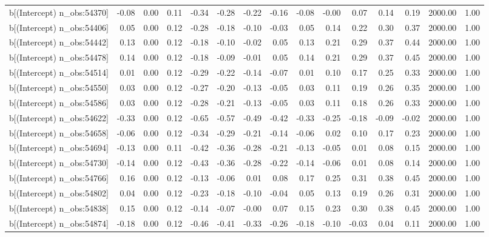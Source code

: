 \begin{table}[ht]
\begin{tabular}{rrrrrrrrrrrrrrr}
  b[(Intercept) n\_obs:54370] & -0.08 & 0.00 & 0.11 & -0.34 & -0.28 & -0.22 & -0.16 & -0.08 & -0.00 & 0.07 & 0.14 & 0.19 & 2000.00 & 1.00 \\ 
  b[(Intercept) n\_obs:54406] & 0.05 & 0.00 & 0.12 & -0.28 & -0.18 & -0.10 & -0.03 & 0.05 & 0.14 & 0.22 & 0.30 & 0.37 & 2000.00 & 1.00 \\ 
  b[(Intercept) n\_obs:54442] & 0.13 & 0.00 & 0.12 & -0.18 & -0.10 & -0.02 & 0.05 & 0.13 & 0.21 & 0.29 & 0.37 & 0.44 & 2000.00 & 1.00 \\ 
  b[(Intercept) n\_obs:54478] & 0.14 & 0.00 & 0.12 & -0.18 & -0.09 & -0.01 & 0.05 & 0.14 & 0.21 & 0.29 & 0.37 & 0.45 & 2000.00 & 1.00 \\ 
  b[(Intercept) n\_obs:54514] & 0.01 & 0.00 & 0.12 & -0.29 & -0.22 & -0.14 & -0.07 & 0.01 & 0.10 & 0.17 & 0.25 & 0.33 & 2000.00 & 1.00 \\ 
  b[(Intercept) n\_obs:54550] & 0.03 & 0.00 & 0.12 & -0.27 & -0.20 & -0.13 & -0.05 & 0.03 & 0.11 & 0.19 & 0.26 & 0.35 & 2000.00 & 1.00 \\ 
  b[(Intercept) n\_obs:54586] & 0.03 & 0.00 & 0.12 & -0.28 & -0.21 & -0.13 & -0.05 & 0.03 & 0.11 & 0.18 & 0.26 & 0.33 & 2000.00 & 1.00 \\ 
  b[(Intercept) n\_obs:54622] & -0.33 & 0.00 & 0.12 & -0.65 & -0.57 & -0.49 & -0.42 & -0.33 & -0.25 & -0.18 & -0.09 & -0.02 & 2000.00 & 1.00 \\ 
  b[(Intercept) n\_obs:54658] & -0.06 & 0.00 & 0.12 & -0.34 & -0.29 & -0.21 & -0.14 & -0.06 & 0.02 & 0.10 & 0.17 & 0.23 & 2000.00 & 1.00 \\ 
  b[(Intercept) n\_obs:54694] & -0.13 & 0.00 & 0.11 & -0.42 & -0.36 & -0.28 & -0.21 & -0.13 & -0.05 & 0.01 & 0.08 & 0.15 & 2000.00 & 1.00 \\ 
  b[(Intercept) n\_obs:54730] & -0.14 & 0.00 & 0.12 & -0.43 & -0.36 & -0.28 & -0.22 & -0.14 & -0.06 & 0.01 & 0.08 & 0.14 & 2000.00 & 1.00 \\ 
  b[(Intercept) n\_obs:54766] & 0.16 & 0.00 & 0.12 & -0.13 & -0.06 & 0.01 & 0.08 & 0.17 & 0.25 & 0.31 & 0.38 & 0.45 & 2000.00 & 1.00 \\ 
  b[(Intercept) n\_obs:54802] & 0.04 & 0.00 & 0.12 & -0.23 & -0.18 & -0.10 & -0.04 & 0.05 & 0.13 & 0.19 & 0.26 & 0.31 & 2000.00 & 1.00 \\ 
  b[(Intercept) n\_obs:54838] & 0.15 & 0.00 & 0.12 & -0.14 & -0.07 & -0.00 & 0.07 & 0.15 & 0.23 & 0.30 & 0.38 & 0.45 & 2000.00 & 1.00 \\ 
  b[(Intercept) n\_obs:54874] & -0.18 & 0.00 & 0.12 & -0.46 & -0.41 & -0.33 & -0.26 & -0.18 & -0.10 & -0.03 & 0.04 & 0.11 & 2000.00 & 1.00 \\ 

\end{tabular}
\end{table}
